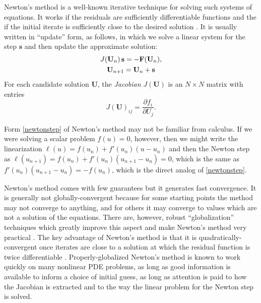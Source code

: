 \documentclass[11pt,final,reqno]{amsart}
\theoremstyle{remark}
\theoremstyle{definition}
\newcommand{\bbF}{\mathbf{F}}
\newcommand{\bU}{\mathbf{U}}
\newcommand{\bs}{\mathbf{s}}
\begin{document}
Newton's method \cite[subsection 9.6]{Pressetal} is a well-known iterative technique for solving such systems of equations.  It works if the residuals are sufficiently differentiable functions and the if the initial iterate is sufficiently close to the desired solution \cite{BurdenFaires}.  It is usually written in ``update'' form, as follows, in which we solve a linear system for the step $\bs$ and then update the approximate solution:
\begin{gather}
J(\bU_n)\, \bs = - \bbF(\bU_n), \label{newtonstep} \\
\bU_{n+1} = \bU_n + \bs \notag
\end{gather}
For each candidate solution $\bU$, the \emph{Jacobian} $J(\bU)$ is an $N\times N$ matrix with entries
\begin{equation} \label{jacobiandefn}
J(\bU)_{ij} = \frac{\partial f_i}{\partial U_j}.
\end{equation}

Form \eqref{newtonstep} of Newton's method may not be familiar from calculus.  If we were solving a scalar problem $f(u)=0$, however, then we might write the linearization $\ell(u)=f(u_n) + f'(u_n)(u-u_n)$ and then the Newton step as $\ell(u_{n+1}) = f(u_n) + f'(u_n) (u_{n+1}-u_n) = 0$, which is the same as $f'(u_n) (u_{n+1} - u_n) = -f(u_n)$, which is the direct analog of \eqref{newtonstep}.

Newton's method comes with few guarantees but it generates fast convergence.  It is generally not globally-convergent because for some starting points the method may not converge to anything, and for others it may converge to values which are not a solution of the equations.  There are, however, robust ``globalization'' techniques which greatly improve this aspect and make Newton's method very practical \cite[subsection 9.7]{Pressetal}.   The key advantage of Newton's method is that it is quadratically-convergent once iterates are close to a solution at which the residual function is twice differentiable \cite{BurdenFaires}.  Properly-globalized Newton's method is known to work quickly on many nonlinear PDE problems, as long as good information is available to inform a choice of initial guess, as long as attention is paid to how the Jacobian is extracted and to the way the linear problem for the Newton step is solved.
\end{document}
